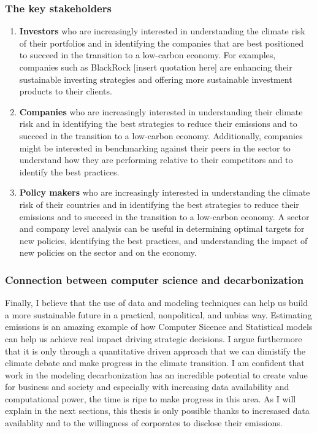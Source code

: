 \subsubsection{The key stakeholders}
 \begin{enumerate}
    \item \textbf{Investors} who are increasingly interested in understanding the climate risk of their portfolios and in identifying the companies that are best positioned to succeed in the transition to a low-carbon economy. For examples, companies such as BlackRock [insert quotation here] are enhancing their sustainable investing strategies and offering more sustainable investment products to their clients.
    \item \textbf{Companies} who are increasingly interested in understanding their climate risk and in identifying the best strategies to reduce their emissions and to succeed in the transition to a low-carbon economy. Additionally, companies might be interested in benchmarking against their peers in the sector to understand how they are performing relative to their competitors and to identify the best practices. 
    \item \textbf{Policy makers} who are increasingly interested in understanding the climate risk of their countries and in identifying the best strategies to reduce their emissions and to succeed in the transition to a low-carbon economy. A sector and company level analysis can be useful in determining optimal targets for new policies, identifying the best practices, and understanding the impact of new policies on the sector and on the economy.
\end{enumerate}

\subsubsection{Connection between computer science and decarbonization}
\noindent Finally, I believe that the use of data and modeling techniques  can help us build a more sustainable future in a practical, nonpolitical, and unbias way. Estimating emissions is an amazing example of how Computer Sicence and Statistical models can help us achieve real impact driving strategic decisions. I argue furthermore that it is only through a quantitative driven approach that we can dimistify the climate debate and make progress in the climate transition. I am confident that work in the modeling decarbonization has an incredible potential to create value for business and society and especially with increasing data availability and computational power, the time is ripe to make progress in this area. As I will explain in the next sections, this thesis is only possible thanks to incresased data availablity and to the willingness of corporates to disclose their emissions.



